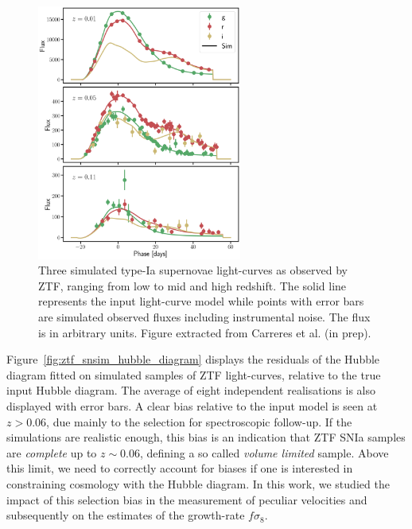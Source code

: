 \begin{figure}[t]
    \centering
    \includegraphics[width=0.6\textwidth]{fig/velocities/snsim_lightcurves.png}
    \caption{Three simulated type-Ia supernovae light-curves as observed by ZTF, ranging from low to mid and high redshift. 
    The solid line represents the input light-curve model while points with error bars are simulated observed fluxes 
    including instrumental noise. The flux is in arbitrary units. Figure extracted from Carreres et al. (in prep). }
    \label{fig:ztf_snsim_lightcurves}
\end{figure}

Figure~\ref{fig:ztf_snsim_hubble_diagram} displays the residuals of the Hubble diagram 
fitted on simulated samples of ZTF light-curves, relative to the true input Hubble diagram. 
The average of eight independent realisations is also displayed with error bars. 
A clear bias relative to the input model is seen at $z > 0.06$, 
due mainly to the selection for spectroscopic follow-up. 
If the simulations are realistic enough, this bias is an indication that ZTF SNIa samples 
are \emph{complete} up to $z \sim 0.06$, defining a so called \emph{volume limited} sample. 
Above this limit, we need to correctly 
account for biases if one is interested in constraining cosmology with the Hubble diagram. 
In this work, we studied the impact of this selection bias in the measurement of peculiar 
velocities and subsequently on the estimates of the growth-rate $f\sigma_8$.  

